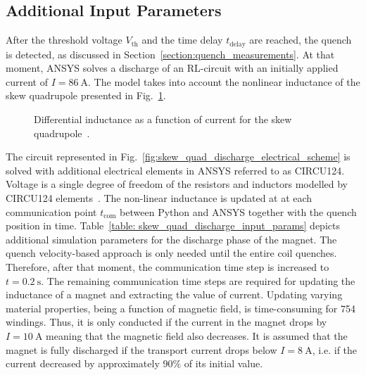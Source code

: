 
\subsection{Additional Input Parameters}

After the threshold voltage $V_\text{th}$ and the time delay $t_\text{delay}$ are reached, the quench is detected, as discussed in Section~\ref{section:quench_measurements}. At that moment, ANSYS solves a discharge of an RL-circuit with an initially applied current of $I=86~\text{A}$. The model takes into account the nonlinear inductance of the skew quadrupole presented in Fig.~\ref{fig:differential_inductance}.

\begin{figure}[H]
    \centering
    \caption{Differential inductance as a function of current for the skew quadrupole~\cite{marco_prioli_mails}.}
    \label{fig:differential_inductance}
\end{figure}

The circuit represented in Fig.~\ref{fig:skew_quad_discharge_electrical_scheme} is solved with additional electrical elements in ANSYS referred to as CIRCU124. Voltage is a single degree of freedom of the resistors and inductors modelled by CIRCU124 elements~\cite{ansys_element_manual}. The non-linear inductance is updated at at each communication point $t_\text{com}$ between Python and ANSYS together with the quench position in time. Table~\ref{table: skew_quad_discharge_input_params} depicts additional simulation parameters for the discharge phase of the magnet. The quench velocity-based approach is only needed until the entire coil quenches. Therefore, after that moment, the communication time step is increased to $t=0.2~\text{s}$. The remaining communication time steps are required for updating the inductance of a magnet and extracting the value of current. Updating varying material properties, being a function of magnetic field, is time-consuming for 754 windings. Thus, it is only conducted if the current in the magnet drops by $I=10~\text{A}$ meaning that the magnetic field also decreases. It is assumed that the magnet is fully discharged if the transport current drops below $I=8~\text{A}$, i.e. if the current decreased by approximately 90\% of its initial value.

